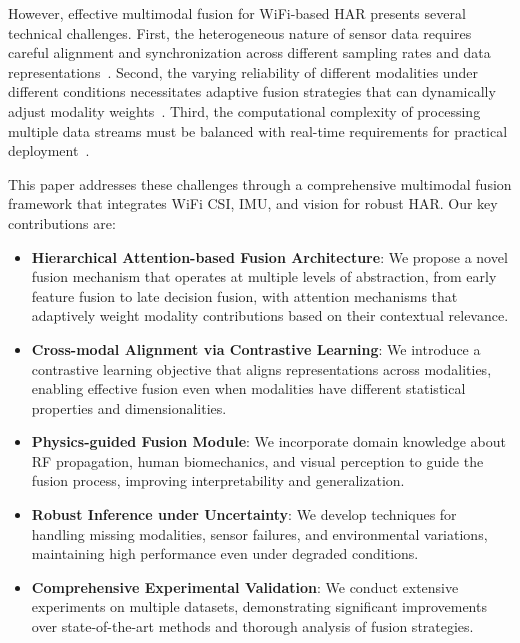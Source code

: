 \documentclass[journal]{IEEEtran}
\begin{document}
However, effective multimodal fusion for WiFi-based HAR presents several technical challenges. First, the heterogeneous nature of sensor data requires careful alignment and synchronization across different sampling rates and data representations~\cite{heterogeneous2023}. Second, the varying reliability of different modalities under different conditions necessitates adaptive fusion strategies that can dynamically adjust modality weights~\cite{adaptive2024}. Third, the computational complexity of processing multiple data streams must be balanced with real-time requirements for practical deployment~\cite{edge2023computing}.

This paper addresses these challenges through a comprehensive multimodal fusion framework that integrates WiFi CSI, IMU, and vision for robust HAR. Our key contributions are:

\begin{itemize}
\item \textbf{Hierarchical Attention-based Fusion Architecture}: We propose a novel fusion mechanism that operates at multiple levels of abstraction, from early feature fusion to late decision fusion, with attention mechanisms that adaptively weight modality contributions based on their contextual relevance.

\item \textbf{Cross-modal Alignment via Contrastive Learning}: We introduce a contrastive learning objective that aligns representations across modalities, enabling effective fusion even when modalities have different statistical properties and dimensionalities.

\item \textbf{Physics-guided Fusion Module}: We incorporate domain knowledge about RF propagation, human biomechanics, and visual perception to guide the fusion process, improving interpretability and generalization.

\item \textbf{Robust Inference under Uncertainty}: We develop techniques for handling missing modalities, sensor failures, and environmental variations, maintaining high performance even under degraded conditions.

\item \textbf{Comprehensive Experimental Validation}: We conduct extensive experiments on multiple datasets, demonstrating significant improvements over state-of-the-art methods and thorough analysis of fusion strategies.
\end{itemize}
\end{document}
